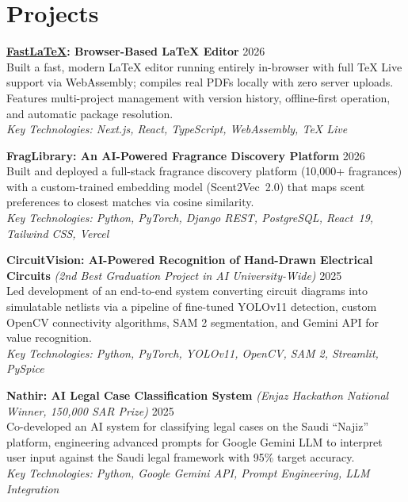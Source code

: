 \documentclass[a4paper,11pt]{article}
\begin{document}
\section{Projects}

\textbf{\href{https://fastlatex.com}{FastLaTeX}: Browser-Based LaTeX Editor} \hfill 2026 \\
Built a fast, modern LaTeX editor running entirely in-browser with full TeX Live support via WebAssembly; compiles real PDFs locally with zero server uploads. Features multi-project management with version history, offline-first operation, and automatic package resolution. \\
{\small\textit{Key Technologies: Next.js, React, TypeScript, WebAssembly, TeX Live}}

\vspace{4pt}
\textbf{FragLibrary: An AI-Powered Fragrance Discovery Platform} \hfill 2026 \\
Built and deployed a full-stack fragrance discovery platform (10,000+ fragrances) with a custom-trained embedding model (Scent2Vec~2.0) that maps scent preferences to closest matches via cosine similarity. \\
{\small\textit{Key Technologies: Python, PyTorch, Django REST, PostgreSQL, React~19, Tailwind CSS, Vercel}}

\vspace{4pt}
\textbf{CircuitVision: AI-Powered Recognition of Hand-Drawn Electrical Circuits} \textit{(2nd Best Graduation Project in AI University-Wide)} \hfill 2025 \\
Led development of an end-to-end system converting circuit diagrams into simulatable netlists via a pipeline of fine-tuned YOLOv11 detection, custom OpenCV connectivity algorithms, SAM 2 segmentation, and Gemini API for value recognition. \\
{\small\textit{Key Technologies: Python, PyTorch, YOLOv11, OpenCV, SAM 2, Streamlit, PySpice}}

\vspace{4pt}
\textbf{Nathir: AI Legal Case Classification System} \textit{(Enjaz Hackathon National Winner, 150,000 SAR Prize)} \hfill 2025 \\
Co-developed an AI system for classifying legal cases on the Saudi ``Najiz'' platform, engineering advanced prompts for Google Gemini LLM to interpret user input against the Saudi legal framework with 95\% target accuracy. \\
{\small\textit{Key Technologies: Python, Google Gemini API, Prompt Engineering, LLM Integration}}
\end{document}
